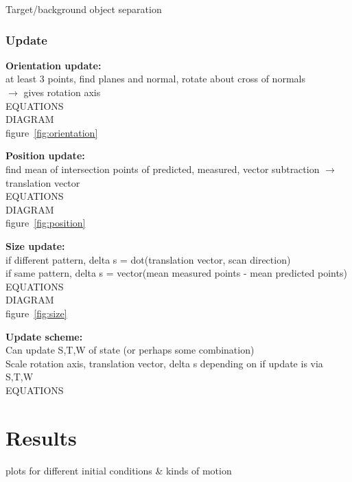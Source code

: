 		\IncMargin{2em}
		\begin{algorithm}
		\DontPrintSemicolon
	
		\caption{Target/background object separation}
		\end{algorithm}
		
	\subsubsection{Update}
		\textbf{Orientation update:}\\
			at least 3 points, find planes and normal, rotate about cross of normals\\
			$\rightarrow$ gives rotation axis\\
			EQUATIONS\\
			DIAGRAM\\
			figure~\ref{fig:orientation}
			
			
		\textbf{Position update:}\\
			find mean of intersection points of predicted, measured, vector subtraction
			$\rightarrow$ translation vector\\
			EQUATIONS\\
			DIAGRAM\\
			figure~\ref{fig:position}
			
			
		\textbf{Size update:}\\
			if different pattern, delta s = dot(translation vector, scan direction)\\
			if same pattern, delta s = vector(mean measured points - mean predicted points)\\
			EQUATIONS\\
			DIAGRAM\\
			figure~\ref{fig:size}
			
			
		\textbf{Update scheme:}\\
			Can update S,T,W of state (or perhaps some combination)\\
			Scale rotation axis, translation vector, delta s depending on if update is via S,T,W\\
			EQUATIONS\\
			
			
\section{Results}
plots for different initial conditions \& kinds of motion
	
